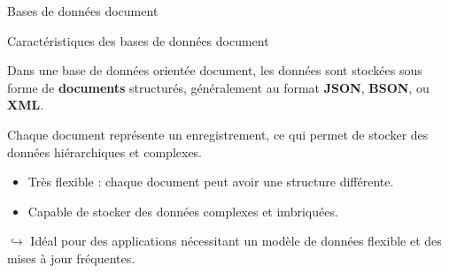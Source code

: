 \begin{frame}[standout]

    Bases de données document

\end{frame}

\begin{frame}{Caractéristiques des bases de données document}

    \begin{definitionbox}
        Dans une base de données orientée document, les données sont stockées
        sous forme de \textbf{documents} structurés, généralement au format
        \textbf{JSON}, \textbf{BSON}, ou \textbf{XML}.

        Chaque document représente un enregistrement, ce qui permet de stocker
        des données hiérarchiques et complexes.
    \end{definitionbox}

    \begin{noteblock}
        \begin{itemize}
            \item Très flexible : chaque document peut avoir une structure
                  différente.
            \item Capable de stocker des données complexes et imbriquées.
        \end{itemize}
        $\hookrightarrow$ Idéal pour des applications nécessitant un modèle de
        données flexible et des mises à jour fréquentes.
    \end{noteblock}

\end{frame}

